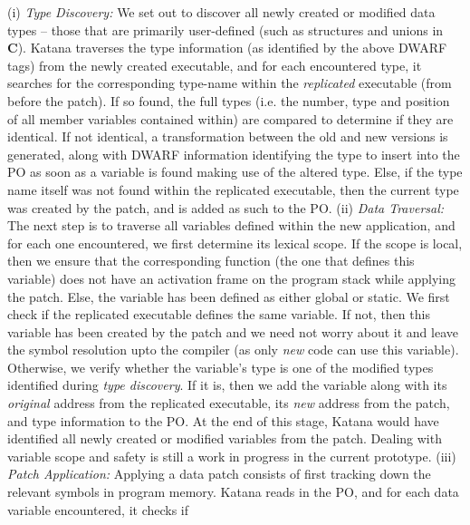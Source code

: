 (i) {\it Type Discovery:} We set out to discover all newly created or
modified data types -- those that are primarily user-defined (such as
structures and unions in {\bf C}). Katana traverses the type information
(as identified by the above DWARF tags) from the newly created executable,
 and for each encountered type, it searches for
the corresponding type-name within the {\it replicated} executable
(from before the patch). If so found, the full types (i.e. the number,
type and position of all member variables contained within) are
compared to determine if they are identical. If not identical,
a transformation between the old and new versions is generated, along
with DWARF information identifying the type to insert into the PO as
soon as a variable is found making use of the altered type.
 Else, if
the type name itself was not found within the replicated executable, then the
current type was created by the patch, and is added as such to the PO.
\newline
(ii) {\it Data Traversal:} The next step is to traverse all variables
defined within the new application, and for each one encountered,
we first determine its 
lexical scope.
If the scope is
local, then we ensure that the corresponding function (the one that
defines this variable) does not have an activation frame on  
the program stack while
applying the patch. Else, the variable has been defined as either
global or static. We first check if the replicated executable defines
the same variable. If not, then this variable has been created by the
patch and we need not worry about it and leave the symbol resolution upto
the compiler (as only {\it new} code can use this variable). Otherwise,
we verify whether the variable's type is one of the
modified types identified during {\it type discovery}. If it is, then
we add the variable along with its {\it original} address from the replicated
executable, its {\it new} address from the patch, and type information to the
PO. At the end of this stage, Katana would have identified all newly
created or modified variables from the patch. Dealing with variable
scope and safety is still a work in progress in the current prototype.
\newline
(iii) {\it Patch Application: } Applying a data patch consists of
first tracking down the relevant symbols in program memory. Katana
reads in the PO, and for each data variable encountered, it checks if
